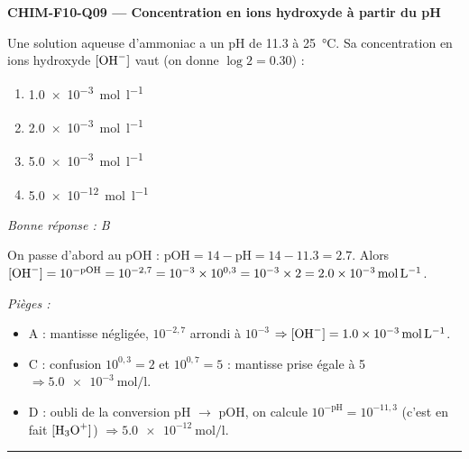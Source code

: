 \documentclass[11pt,a4paper]{article}
\begin{document}
\noindent\textbf{CHIM-F10-Q09 --- Concentration en ions hydroxyde à partir du pH}\par
Une solution aqueuse d'ammoniac a un pH de \num{11.3} à \qty{25}{\celsius}. Sa concentration en ions hydroxyde $[\ce{OH-}]$ vaut (on donne $\log 2 = \num{0.30}$) :
\begin{enumerate}[label=\Alph*)]
\item \qty{1.0e-3}{\mol\per\litre}
\item \qty{2.0e-3}{\mol\per\litre}
\item \qty{5.0e-3}{\mol\per\litre}
\item \qty{5.0e-12}{\mol\per\litre}
\end{enumerate}
\textit{Bonne réponse : B}\par
On passe d'abord au pOH : $\mathrm{pOH} = 14 - \mathrm{pH} = 14 - \num{11.3} = \num{2.7}$. Alors $[\ce{OH-}] = 10^{-\mathrm{pOH}} = 10^{-2{,}7} = 10^{-3}\times 10^{0{,}3} = 10^{-3}\times 2 = \qty{2.0e-3}{\mol\per\litre}$.\par
\textit{Pièges :}
\begin{itemize}
\item A : mantisse négligée, $10^{-2{,}7}$ arrondi à $10^{-3}$ $\Rightarrow [\ce{OH-}] = \qty{1.0e-3}{\mol\per\litre}$.
\item C : confusion $10^{0{,}3}=2$ et $10^{0{,}7}=5$ : mantisse prise égale à 5 $\Rightarrow \qty{5.0e-3}{\mol\per\litre}$.
\item D : oubli de la conversion pH $\to$ pOH, on calcule $10^{-\mathrm{pH}} = 10^{-11{,}3}$ (c'est en fait $[\ce{H3O+}]$) $\Rightarrow \qty{5.0e-12}{\mol\per\litre}$.
\end{itemize}
\vspace{6pt}\hrule\vspace{8pt}
\end{document}
